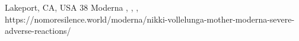          {Lakeport, CA, USA}
          {38}
          {Moderna}
          {, }
          {
            ,
            ,
          }
          {https://nomoresilence.world/moderna/nikki-vollelunga-mother-moderna-severe-adverse-reactions/}

